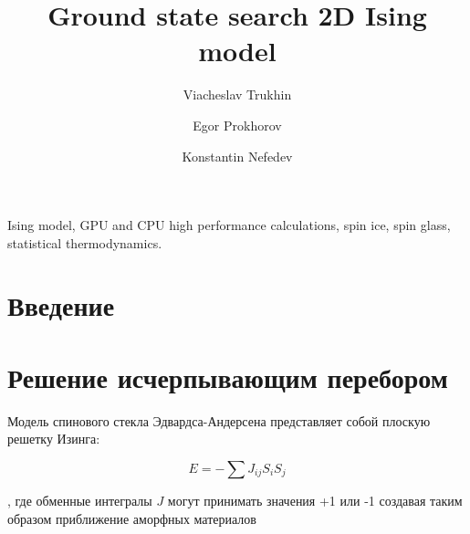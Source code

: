 \documentclass[utf8, babel, sor, jor, amsmath,amssymb, reprint]{elsarticle} %
\begin{document}
\begin{frontmatter}


\title{Ground state search 2D Ising model}

\author[mainaddress, secondaryaddress]{Viacheslav Trukhin}

\author[mainaddress]{Egor Prokhorov}

\author[mainaddress, secondaryaddress]{Konstantin Nefedev}


\address[mainaddress]{Far Eastern Federal University, Vladivostok, Russky Island, 10 Ajax Bay, 690922, the Russian Federation}
\address[secondaryaddress]{Institute of Applied Mathematics, Far Eastern Branch, Russian Academy of Science, Vladivostok, Radio 7, 690041, the Russian Federation}

\begin{abstract}


\end{abstract}


\begin{keyword}
Ising model, GPU and CPU high performance calculations, spin ice, spin glass, statistical thermodynamics.

\end{keyword}


\end{frontmatter}

\linenumbers
\newpage
\tableofcontents

\newpage
\section{Введение}



\section{Решение исчерпывающим перебором}

Модель спинового стекла Эдвардса-Андерсена представляет собой плоскую решетку Изинга:

\begin{equation}
	E = -\sum J_{ij} S_i S_j
	\label{eq:ising_energy}
\end{equation}

, где обменные интегралы $J$ могут принимать значения +1 или -1 создавая таким образом приближение аморфных материалов
\end{document}
